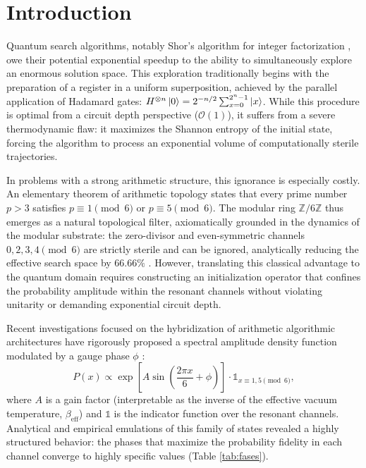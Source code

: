 \documentclass[12pt,a4paper]{article}
\theoremstyle{plain}
\theoremstyle{definition}
\theoremstyle{remark}
\begin{document}
\tableofcontents
\newpage

\section{Introduction}
\label{sec:intro}

Quantum search algorithms, notably Shor's algorithm for integer factorization \cite{Shor1994}, owe their potential exponential speedup to the ability to simultaneously explore an enormous solution space. This exploration traditionally begins with the preparation of a register in a uniform superposition, achieved by the parallel application of Hadamard gates: $H^{\otimes n}\ket{0} = 2^{-n/2}\sum_{x=0}^{2^n-1}\ket{x}$. While this procedure is optimal from a circuit depth perspective ($\mathcal{O}(1)$), it suffers from a severe thermodynamic flaw: it maximizes the Shannon entropy of the initial state, forcing the algorithm to process an exponential volume of computationally sterile trajectories.

In problems with a strong arithmetic structure, this ignorance is especially costly. An elementary theorem of arithmetic topology states that every prime number $p>3$ satisfies $p \equiv 1 \pmod 6$ or $p \equiv 5 \pmod 6$. The modular ring $\mathbb{Z}/6\mathbb{Z}$ thus emerges as a natural topological filter, axiomatically grounded in the dynamics of the modular substrate: the zero-divisor and even-symmetric channels $0,2,3,4 \pmod 6$ are strictly sterile and can be ignored, analytically reducing the effective search space by $66.66\%$ \cite{Peinador_Modular_Substrate_2025, Peinador_Emergencia_Geometria_2025}. However, translating this classical advantage to the quantum domain requires constructing an initialization operator that confines the probability amplitude within the resonant channels without violating unitarity or demanding exponential circuit depth.

Recent investigations focused on the hybridization of arithmetic algorithmic architectures have rigorously proposed a spectral amplitude density function modulated by a gauge phase $\phi$ \cite{Peinador_Isomorfismo_DSP_2025}:
\begin{equation}
P(x) \propto \exp\left[A \sin\left(\frac{2\pi x}{6} + \phi\right)\right] \cdot \mathds{1}_{x\equiv 1,5 \pmod{6}},
\label{eq:amplitud}
\end{equation}
where $A$ is a gain factor (interpretable as the inverse of the effective vacuum temperature, $\beta_{\text{eff}}$) and $\mathds{1}$ is the indicator function over the resonant channels. Analytical and empirical emulations of this family of states revealed a highly structured behavior: the phases that maximize the probability fidelity in each channel converge to highly specific values (Table \ref{tab:fases}).
\end{document}
